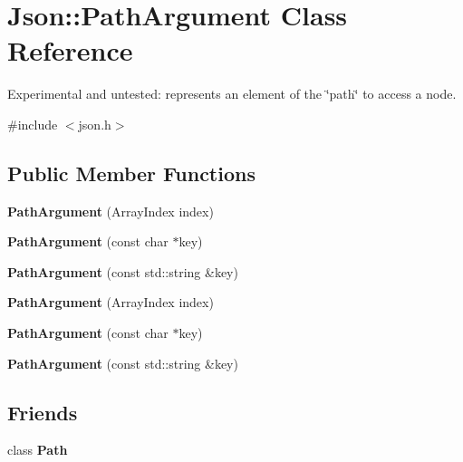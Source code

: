 \section{Json\+:\+:Path\+Argument Class Reference}
\label{class_json_1_1_path_argument}


Experimental and untested\+: represents an element of the \char`\"{}path\char`\"{} to access a node.  




{\ttfamily \#include $<$json.\+h$>$}

\subsection*{Public Member Functions}
\begin{DoxyCompactItemize}
\item 
{\bfseries Path\+Argument} (Array\+Index index)\label{class_json_1_1_path_argument_a53c5b27143b161301b95fd544c139ecf}

\item 
{\bfseries Path\+Argument} (const char $\ast$key)\label{class_json_1_1_path_argument_a9690417a8a40e6e49f2acdf6c9281345}

\item 
{\bfseries Path\+Argument} (const std\+::string \&key)\label{class_json_1_1_path_argument_a08f872cfee4fc600f7fa3bcaaff0d41c}

\item 
{\bfseries Path\+Argument} (Array\+Index index)\label{class_json_1_1_path_argument_a53c5b27143b161301b95fd544c139ecf}

\item 
{\bfseries Path\+Argument} (const char $\ast$key)\label{class_json_1_1_path_argument_a9690417a8a40e6e49f2acdf6c9281345}

\item 
{\bfseries Path\+Argument} (const std\+::string \&key)\label{class_json_1_1_path_argument_a08f872cfee4fc600f7fa3bcaaff0d41c}

\end{DoxyCompactItemize}
\subsection*{Friends}
\begin{DoxyCompactItemize}
\item 
class {\bfseries Path}\label{class_json_1_1_path_argument_a51971c24df68e5ad775ed4f8c33e968f}

\end{DoxyCompactItemize}


